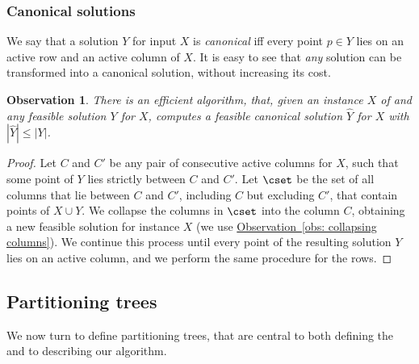 \documentclass[11pt]{article}
\numberwithin{equation}{section}
\theoremstyle{definition}
\theoremstyle{plain}
\newcommand{\expref}[2]{\hyperref[#2]{#1~\ref{#2}}}
\newtheorem{myobs}[theorem]{Observation}
\begin{document}
%



\subsubsection{Canonical solutions} 
We say that a solution $Y$ for input $X$ is \emph{canonical} iff every point $p\in Y$ lies on an active row and an active column of $X$. %
%
It is easy to see that \emph{any} solution can be transformed into a canonical solution, without increasing its cost. %

\begin{myobs} \label{obs: canonical solutions} There is an efficient algorithm, that, given an instance $X$ of \minsat and
	 any feasible solution $Y$ for $X$, computes a feasible canonical solution $\hat{Y}$ for $X$ with $|\hat{Y}| \leq |Y|$.  %
\end{myobs} 
\begin{proof}
Let $C$ and $C'$ be any pair of consecutive active columns for $X$, such that some point of $Y$ lies strictly between $C$ and $C'$. Let $\cset$ be the set of all columns that lie between $C$ and $C'$, including $C$ but excluding $C'$, that contain points of $X\cup Y$. We collapse the columns in $\cset$ into the column $C$, obtaining a new feasible solution for instance $X$ (we use \expref{Observation}{obs: collapsing columns}). We continue this process until every point of the resulting solution $Y$ lies on an active column, and we perform the same procedure for the rows.
\end{proof}

\subsection{Partitioning trees}

We now turn to define partitioning trees, that are central to both defining the \WBone and to describing our algorithm.
\end{document}
